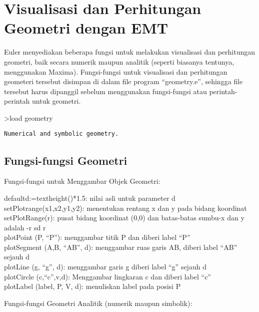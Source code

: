 \documentclass[
]{book}
\begin{document}
\chapter{Visualisasi dan Perhitungan Geometri dengan EMT}\label{visualisasi-dan-perhitungan-geometri-dengan-emt}

Euler menyediakan beberapa fungsi untuk melakukan visualisasi dan perhitungan geometri, baik secara numerik maupun analitik (seperti biasanya tentunya, menggunakan Maxima). Fungsi-fungsi untuk visualisasi dan perhitungan geometeri tersebut disimpan di dalam file program ``geometry.e'', sehingga file tersebut harus dipanggil sebelum menggunakan fungsi-fungsi atau perintah-perintah untuk geometri.

\textgreater load geometry

\begin{verbatim}
Numerical and symbolic geometry.
\end{verbatim}

\section{Fungsi-fungsi Geometri}\label{fungsi-fungsi-geometri}

Fungsi-fungsi untuk Menggambar Objek Geometri:

defaultd:=textheight()*1.5: nilai asli untuk parameter d\\
setPlotrange(x1,x2,y1,y2): menentukan rentang x dan y pada bidang koordinat\\
setPlotRange(r): pusat bidang koordinat (0,0) dan batas-batas sumbu-x dan y adalah -r sd r\\
plotPoint (P, ``P''): menggambar titik P dan diberi label ``P''\\
plotSegment (A,B, ``AB'', d): menggambar ruas garis AB, diberi label ``AB'' sejauh d\\
plotLine (g, ``g'', d): menggambar garis g diberi label ``g'' sejauh d\\
plotCircle (c,``c'',v,d): Menggambar lingkaran c dan diberi label ``c''\\
plotLabel (label, P, V, d): menuliskan label pada posisi P

Fungsi-fungsi Geometri Analitik (numerik maupun simbolik):
\end{document}
